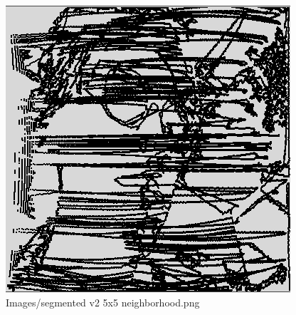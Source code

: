 \begin{figure}[H]
\includegraphics[width=\textwidth]{Images/segmented_v2_5x5_neighborhood.png}
\caption{Images/segmented v2 5x5 neighborhood.png}
\label{fig:Images/segmented v2 5x5 neighborhood.png}
\end{figure}
